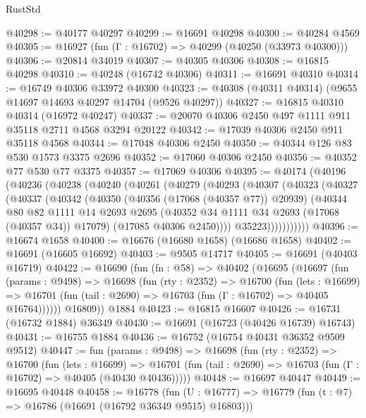 \begin{lexlean}{RustStd}
\begin{coremodule}
@40298 := @40177 @40297
@40299 := @16691 @40298
@40300 := @40284 @4569
@40305 := @16927 (fun (Γ : @16702) => @40299 (@40250 (@33973 @40300)))
@40306 := @20814 @34019
@40307 := @40305 @40306
@40308 := @16815 @40298
@40310 := @40248 (@16742 @40306)
@40311 := @16691 @40310
@40314 := @16749 @40306 @33972 @40300
@40323 := @40308 (@40311 @40314) (@9655 @14697 @14693 @40297 @14704 (@9526 @40297))
@40327 := @16815 @40310 @40314 (@16972 @40247)
@40337 := @20070 @40306 @2450 @497 @1111 @911 @35118 @2711 @4568 @3294 @20122
@40342 := @17039 @40306 @2450 @911 @35118 @4568
@40344 := @17048 @40306 @2450
@40350 := @40344 @126 @83 @530 @1573 @3375 @2696
@40352 := @17060 @40306 @2450
@40356 := @40352 @77 @530 @77 @3375
@40357 := @17069 @40306
@40395 := @40174
    (@40196
      (@40236
        (@40238
          (@40240
            (@40261
              (@40279
                (@40293
                  (@40307
                    (@40323
                      (@40327
                        (@40337
                          (@40342
                            (@40350
                              (@40356 (@17068 (@40357 @77)) @20939)
                              (@40344
                                @80
                                @82
                                @1111
                                @14
                                @2693
                                @2695
                                (@40352 @34 @1111 @34 @2693 (@17068 (@40357 @34)) @17079)
                                (@17085 @40306 @2450))))
                          @35223)))))))))))
@40396 := @16674 @1658
@40400 := @16676 (@16680 @1658) (@16686 @1658)
@40402 := @16691 (@16605 @16692)
@40403 := @9505 @14717
@40405 := @16691 (@40403 @16719)
@40422 := @16690
    (fun (fn : @58) =>
    @40402
      (@16695
        (@16697
          (fun (params : @9498) =>
          @16698
            (fun (rty : @2352) =>
            @16700
              (fun (lets : @16699) =>
              @16701 (fun (tail : @2690) => @16703 (fun (Γ : @16702) => @40405 @16764))))))
        @16809))
    @1884
@40423 := @16815 @16607
@40426 := @16731 (@16732 @1884) @36349
@40430 := @16691 (@16723 (@40426 @16739) @16743)
@40431 := @16755 @1884
@40436 := @16752 (@16754 @40431 @36352 @9509 @9512)
@40447 := fun (params : @9498) =>
  @16698
    (fun (rty : @2352) =>
    @16700
      (fun (lets : @16699) =>
      @16701 (fun (tail : @2690) => @16703 (fun (Γ : @16702) => @40405 (@40430 @40436)))))
@40448 := @16697 @40447
@40449 := @16695 @40448
@40458 := @16778
    (fun (U : @16777) => @16779 (fun (t : @7) => @16786 (@16691 (@16792 @36349 @9515) @16803)))

\end{coremodule}
\end{lexlean}
